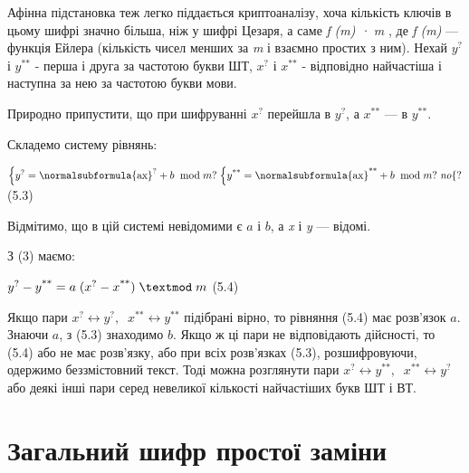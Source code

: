 {Афінна підстановка теж легко піддається криптоаналізу, хоча кількість ключів в
цьому шифрі значно більша, ніж у шифрі Цезаря, а саме 
\textit{\textgreek{f}}\textit{ (m) · }\textit{m} , де
\textit{\textgreek{f}}\textit{ (m)} --- функція Ейлера (кількість чисел менших за
\textit{m} і взаємно простих з ним). Нехай   $y^{?}$ і  $y^{\text{**}}$
- перша і друга за частотою букви ШТ,  $x^{?}$ і  $x^{\text{**}}$ -
відповідно найчастіша і наступна за нею за частотою букви мови.

Природно припустити, що при шифруванні  $x^{?}$ перейшла в  $y^{?}$, а 
$x^{\text{**}}$ --- в  $y^{\text{**}}$.

Складемо систему рівнянь:


\bigskip

{\centering
\textsf{ }
${\begin{matrix}\left\{ y^{?}=\normalsubformula{\text{ax}}^{?}+b\;\;\text{mod}\;m? \right.\left\{ y^{\text{**}}=\normalsubformula{\text{ax}}^{\text{**}}+b\;\;\text{mod}\;m? \right.\mathit{no}\hfill\null
\end{matrix}\{?}$\textsf{  }(5.3)
\par}


\bigskip

Відмітимо, що в цій системі невідомими є  $a$ і   $b$, а 
\textit{x}\textbf{\textit{ }}і\textbf{\textit{ }}\textit{ }\textit{y} --- відомі.

З (3)\textbf{ }маємо:

{\centering
\textsf{ }
$y^{?}-y^{\text{**}}=a\;(x^{?}-x^{\text{**}})\;\textmod\;m$\textsf{
 }(5.4)
\par}


\bigskip

Якщо пари  ${x^{?}\leftrightarrow y^{?},\;\;x^{\text{**}}\leftrightarrow
y^{\text{**}}}$ підібрані  вірно, то рівняння (5.4) має розв’язок  $a$.
Знаючи  $a$, з (5.3) знаходимо  $b$. Якщо ж ці пари не відповідають
дійсності, то (5.4) або не має розв’язку, або при всіх розв’язках (5.3),
розшифровуючи, одержимо беззмістовний текст. Тоді можна розглянути пари 
${x^{?}\leftrightarrow y^{\text{**}},\;\;x^{\text{**}}\leftrightarrow
y^{?}}$ або деякі інші пари серед невеликої кількості найчастіших букв ШТ і
ВТ.


\bigskip


\bigskip

\section{Загальний шифр простої заміни}


}
